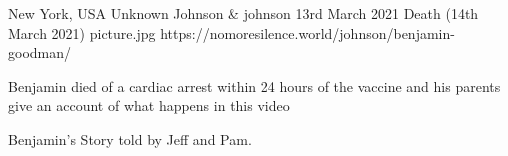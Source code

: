 {New York, USA}
{Unknown}
{Johnson \& johnson}
{13rd March 2021}
{Death (14th March 2021)}
{picture.jpg}
{https://nomoresilence.world/johnson/benjamin-goodman/}
{

Benjamin died of a cardiac arrest within 24 hours of the vaccine and his parents
give an account of what happens in this video

Benjamin’s Story told by Jeff and Pam.
}
